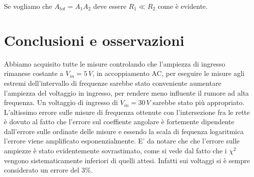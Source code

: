 \documentclass[10pt,a4paper]{article}
\begin{document}
Se vogliamo che $A_{tot} = A_1 A_2$ deve essere $R_1 \ll R_2$ come è evidente.

\section{Conclusioni e osservazioni}
Abbiamo acquisito tutte le misure controlando che l'ampiezza di ingresso rimanese costante a $V_{in} = 5 \, V$, in accoppiamento AC, per eseguire le misure agli estremi dell'intervallo di frequenze sarebbe stato conveniente aumentare l'ampiezza del voltaggio in ingresso, per rendere meno influente il rumore ad alta frequenza. Un voltaggio di ingresso di $V_{in} = 30 \, V$ sarebbe stato più appropriato. L'altissimo errore sulle misure di frequenza ottenute con l'intersezione fra le rette è dovuto al fatto che l'errore sul coeffiente angolare è fortemente dipendente dall'errore sulle ordinate delle misure e essendo la scala di fequenza logaritmica l'errore viene amplificato esponenzialmente. E' da notare che che l'errore sulle ampiezze è stato evidentemente sovrastimato, come si vede dal fatto che i $\chi^2$ vengono sistematicamente inferiori di quelli attesi. Infatti sui voltaggi si è sempre considerato un errore del $3\%$.
\end{document}

